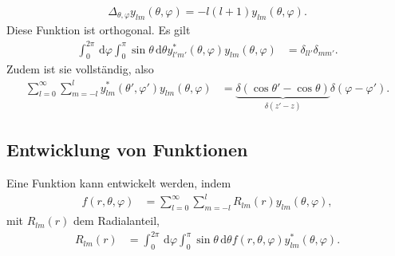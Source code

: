 \documentclass[a4paper,12pt]{article}
\newcommand{\td}{\,\text{d}}
\numberwithin{equation}{section}
\begin{document}
\begin{align} 
        \Delta_{\theta ,\varphi }y_{l m}\left(\theta ,\varphi \right)=-l\left(l+1\right)y_{l m}\left(\theta ,\varphi \right)
.\end{align} 
Diese Funktion ist orthogonal. Es gilt
\begin{align} 
        \int_{0}^{2\pi }\td \varphi \int_{0}^{\pi }\sin \theta \td \theta y_{l'm'}^*\left(\theta ,\varphi \right)y_{l m}\left(\theta ,\varphi \right)&=\delta _{ll'}\delta _{mm'}
.\end{align} 
Zudem ist sie vollständig, also
\begin{align} 
        \sum_{l=0}^{\infty}\sum_{m=-l}^{l}y_{l m}^*\left(\theta ',\varphi '\right)y_{l m}\left(\theta ,\varphi \right)&=\underbrace{\delta \left(\cos \theta '-\cos \theta \right)}_{\delta \left(z'-z\right)}\delta \left(\varphi -\varphi '\right)
.\end{align} 

\subsection{Entwicklung von Funktionen}
Eine Funktion kann entwickelt werden, indem
\begin{align} 
        f\left(r,\theta ,\varphi \right)&=\sum_{l=0}^{\infty}\sum_{m=-l}^{l}R_{l m}\left(r\right)y_{l m}\left(\theta ,\varphi \right)
,\end{align} 
mit $R_{l m}\left(r\right)$ dem Radialanteil,
\begin{align} 
        R_{l m}\left(r\right)&=\int_{0}^{2\pi }\td \varphi \int_{0}^{\pi }\sin \theta \td \theta f\left(r,\theta ,\varphi \right)y_{l m}^*\left(\theta ,\varphi \right)
.\end{align} 
\end{document}
